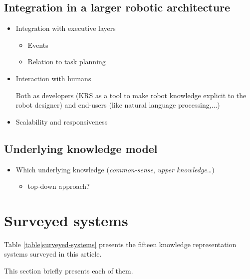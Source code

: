 \documentclass[a4paper]{article}
\begin{document}
\subsection{Integration in a larger robotic architecture}

\begin{itemize}

	\item  Integration with executive layers
	\begin{itemize}
		\item  Events
		\item  Relation to task planning
	\end{itemize}

	\item Interaction with humans

	Both as developers (KRS as a tool to make robot knowledge explicit to the
	robot designer) and end-users (like natural language processing,...)

	\item  Scalability and responsiveness
\end{itemize}

\subsection{Underlying knowledge model}

\begin{itemize}
	\item  Which underlying knowledge (\emph{common-sense}, \emph{upper knowledge}\ldots{})
	\begin{itemize}
		\item  top-down approach?
	\end{itemize}

\end{itemize}

\section{Surveyed systems}

Table \ref{table|surveyed-systems} presents the fifteen knowledge representation systems surveyed
in this article.

This section briefly presents each of them.
\end{document}
